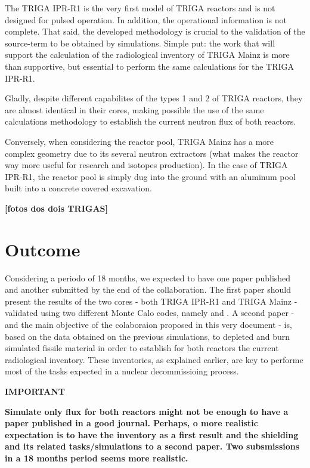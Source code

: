 \documentclass[11pt]{article} %
\begin{document}
The TRIGA IPR-R1 is the very first model of TRIGA reactors and is not designed for pulsed operation. In addition, the operational information is not complete. That said, the developed methodology is crucial to the validation of the source-term to be obtained by simulations. Simple put: the work that will support the calculation of the radiological inventory of TRIGA Mainz is more than supportive, but essential to perform the same calculations for the TRIGA IPR-R1.

Gladly, despite different capabilites of the types 1 and 2 of TRIGA reactors, they are almost identical in their cores, making possible the use of the same calculations methodology to establish the current neutron flux of both reactors.

Conversely, when considering the reactor pool, TRIGA Mainz has a more complex geometry due to its several neutron extractors (what makes the reactor way more useful for research and isotopes production). In the case of TRIGA IPR-R1, the reactor pool is simply dug into the ground with an aluminum pool built into a concrete covered excavation.

\textbf{[fotos dos dois TRIGAS]}

\section{Outcome}

Considering a periodo of 18 months, we expected to have one paper published and another submitted by the end of the collaboration. The first paper should present the results of the two cores - both TRIGA IPR-R1 and TRIGA Mainz - validated using two different Monte Calo codes, namely \cite[OpenMC]{OpenMC_2015} and \cite[SCALE]{SCALE_632}. A second paper - and the main objective of the colaboraion proposed in this very document - is, based on the data obtained on the previous simulations, to depleted and burn simulated fissile material in order to establish for both reactors the current radiological inventory. These inventories, as explained earlier, are key to performe most of the tasks expected in a nuclear decommissioing process.

\textbf{IMPORTANT}

\textbf{Simulate only flux for both reactors might not be enough to have a paper published in a good journal. Perhaps, o more realistic expectation is to have the inventory as a first result and the shielding and its related tasks/simulations to a second paper. Two subsmissions in a 18 months period seems more realistic.}
\end{document}
